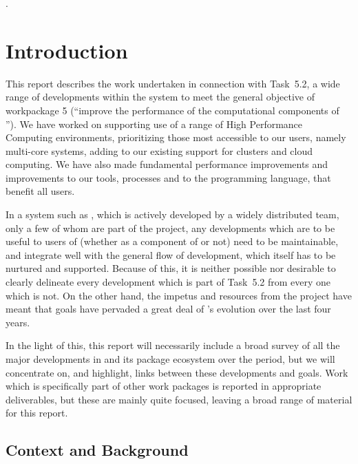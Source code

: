 .



\section{Introduction}
This report describes the work undertaken in connection with Task~5.2,
  a wide range of developments within the \GAP system to meet the
  general objective of workpackage 5 (``improve the performance of the
  computational components of \ODK''). We have worked on supporting
  use of a range of High Performance Computing environments,
  prioritizing those most accessible to our users, namely multi-core
  systems, adding to our existing support for clusters and cloud
  computing. We have also made fundamental performance improvements
  and improvements to our tools, processes and to the programming
  language, that benefit all \GAP users.

In a system such as \GAP, which is actively developed by a widely
distributed team, only a few of whom are part of the \ODK project, any
developments which are to be useful to users of \GAP (whether as a component of
\ODK or not) need to be maintainable, and
integrate well with the general flow of \GAP development, which itself
has to be nurtured and supported. Because of this, it is neither
possible nor desirable to clearly delineate every development which
is part of Task~5.2 from every one which is not. On the other hand,
the impetus and resources from the \ODK project have meant that \ODK
goals have pervaded a great deal of \GAP's evolution over the last
four years.

In the light of this, this report will necessarily include  a broad
survey of all the major developments in \GAP and its package ecosystem
over the period, but we will concentrate on, and highlight, links between
these developments and \ODK goals. Work which is specifically part of
other work packages is reported in appropriate deliverables, but these
are mainly quite focused, leaving a broad range of material for this report.

\subsection{Context and Background}

